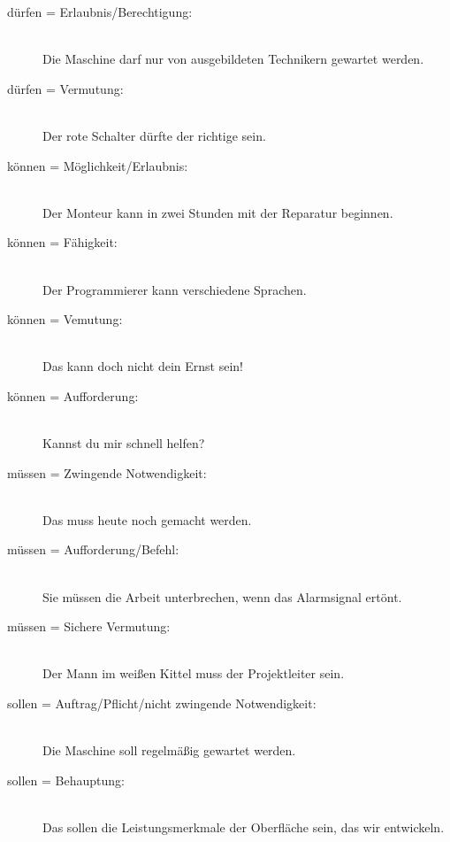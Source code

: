 \documentclass[a4paper,titlepage=true,twoside]{scrartcl}
\begin{document}
\begin{description}
\item[dürfen = Erlaubnis/Berechtigung:]\hspace{0pt}\\
Die Maschine darf nur von ausgebildeten Technikern gewartet werden.

\item[dürfen = Vermutung:]\hspace{0pt}\\
Der rote Schalter dürfte der richtige sein.

\item[können = Möglichkeit/Erlaubnis:]\hspace{0pt}\\
Der Monteur kann in zwei Stunden mit der Reparatur beginnen.

\item[können = Fähigkeit:]\hspace{0pt}\\
Der Programmierer kann verschiedene Sprachen.

\item[können = Vemutung:]\hspace{0pt}\\
Das kann doch nicht dein Ernst sein!

\item[können = Aufforderung:]\hspace{0pt}\\
Kannst du mir schnell helfen?

\item[müssen = Zwingende Notwendigkeit:]\hspace{0pt}\\
Das muss heute noch gemacht werden.

\item[müssen = Aufforderung/Befehl:]\hspace{0pt}\\
Sie müssen die Arbeit unterbrechen, wenn das Alarmsignal ertönt.

\item[müssen = Sichere Vermutung:]\hspace{0pt}\\
Der Mann im weißen Kittel muss der Projektleiter sein.

\item[sollen = Auftrag/Pflicht/nicht zwingende Notwendigkeit:]\hspace{0pt}\\
Die Maschine soll regel\-mäßig gewartet werden.

\item[sollen = Behauptung:]\hspace{0pt}\\
Das sollen die Leistungsmerkmale der Oberfläche sein, das wir entwickeln.
\end{description}
\end{document}
